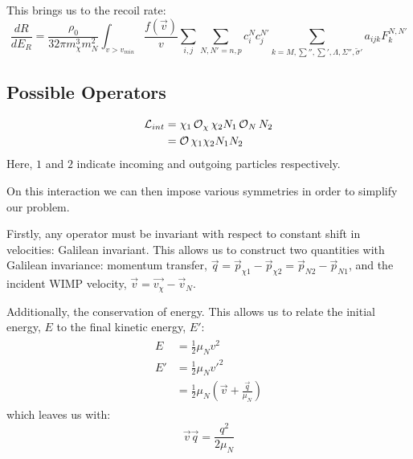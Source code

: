 \par
This brings us to the recoil rate:
\begin{equation}
    \frac{dR}{dE_R} = \frac{\rho_0}{32\pi m_\chi^3 m_N^2} \int_{v>v_{min}} \frac{f(\vec{v})}{v} \sum_{i,j} \sum_{N,N'=n,p} c^{N}_i c^{N'}_j \sum_{k=M, \sum'', \sum', \Lambda, \Sigma'', \tilde{\sigma}'} a_{ijk}F_k^{N,N'}
\label{eq:ref_recoil_spectrum}
\end{equation}

\subsection{Possible Operators}
\par

\begin{align}
\begin{split}
    \operatorname{\mathcal{L}}_{int} &= \chi_{1} \operatorname{\mathcal{O}}_{\chi} \chi_{2} N_{1} \operatorname{\mathcal{O}}_{N} N_{2} \\
                      &= \operatorname{\mathcal{O}} \chi_{1}\chi_{2} N_{1}N_{2}
\end{split}
\end{align}
Here, $1$ and $2$ indicate incoming and outgoing particles respectively.

\par
On this interaction we can then impose various symmetries in order to simplify our problem.

\par
Firstly, any operator must be invariant with respect to constant shift in velocities: Galilean invariant.
This allows us to construct two quantities with Galilean invariance: momentum transfer, $\vec{q} = \vec{p}_{\chi 1} - \vec{p}_{\chi 2} = \vec{p}_{N 2} - \vec{p}_{N 1}$, and the incident WIMP velocity, $\vec{v}=\vec{v_\chi} - \vec{v}_N$.

\par
Additionally, the conservation of energy.
This allows us to relate the initial energy, $E$ to the final kinetic energy, $E'$:
\begin{align}
\begin{split}
    E  &= \frac{1}{2}\mu_N v^2 \\
    E' &= \frac{1}{2}\mu_N v'^2 \\
       &= \frac{1}{2}\mu_N (\vec{v} + \frac{\vec{q}}{\mu_N})
\end{split}
\end{align}
which leaves us with:
\begin{equation}
    \vec{v}\vec{q} = \frac{q^2}{2\mu_N}
\end{equation}


